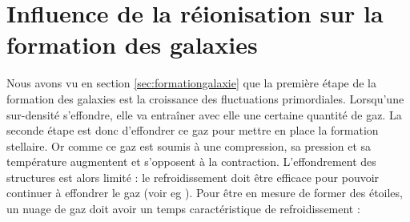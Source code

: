 

%


%
%



\section{Influence de la réionisation sur la formation des galaxies}
\label{sec:refroidissement}

Nous avons vu en section \ref{sec:formationgalaxie} que la première étape de la formation des galaxies est la croissance des fluctuations primordiales.
Lorsqu'une sur-densité s’effondre, elle va entraîner avec elle une certaine quantité de gaz.
La seconde étape est donc d’effondrer ce gaz pour mettre en place la formation stellaire.
Or comme ce gaz est soumis à une compression, sa pression et sa température augmentent et s'opposent à la contraction.
L'effondrement des structures est alors limité : le refroidissement doit être efficace pour pouvoir continuer à effondrer le gaz (voir eg \cite{2004ARA&A..42...79B}).
Pour être en mesure de former des étoiles, un nuage de gaz doit avoir un temps caractéristique de refroidissement :


